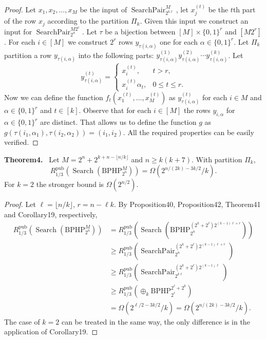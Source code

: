 \documentclass[10pt,a4paper]{article}
\newenvironment{authorclaim}[1]{\par\medskip\noindent\textbf{#1.}\ \ignorespaces}{\par\medskip}
\begin{document}
\begin{proof}
Let $x_1,x_2,\ldots,x_M$ be the input of $\operatorname{SearchPair}_{2^{k\ell}}^M$, let $x_j^{(t)}$ be the $t$th part of the row $x_j$ according to the partition $\Pi_k$. Given this input we construct an input for $\operatorname{SearchPair}_{2^n}^{M2^r}$.
Let $\tau$ be a bijection between $[M]\times\{0,1\}^r$ and $[M2^r]$.
For each $i\in[M]$ we construct $2^r$ rows $y_{\tau(i,\alpha)}$ one for each $\alpha\in\{0,1\}^r$. Let $\Pi_k$ partition a row $y_{\tau(i,\alpha)}$ into the following parts: $y_{\tau(i,\alpha)}^{(1)}y_{\tau(i,\alpha)}^{(2)}\cdots y_{\tau(i,\alpha)}^{(k)}$. Let
\[
y_{\tau(i,\alpha)}^{(t)}
=\begin{cases}x_i^{(t)},&t>r,\\x_i^{(t)}\alpha_t,&0\le t\le r.\end{cases}
\]
Now we can define the function $f_t(x_1^{(t)},\ldots,x_M^{(t)})$ as $y_{\tau(i,\alpha)}^{(t)}$ for each $i\in M$ and $\alpha\in\{0,1\}^r$ and $t\in[k]$. Observe that for each $i\in[M]$ the rows $y_{i,\alpha}$ for $\alpha\in\{0,1\}^r$ are distinct. That allows us to define the function $g$ as $g(\tau(i_1,\alpha_1),\tau(i_2,\alpha_2))=(i_1,i_2)$. All the required properties can be easily verified.
\end{proof}
\begin{authorclaim}{Theorem4}
Let $M=2^n+2^{k+n-\lfloor n/k\rfloor}$ and $n\ge k(k+7)$. With partition $\Pi_k$,
\[
R^{\mathrm{pub}}_{1/3}(\operatorname{Search}(\mathrm{BPHP}_{2^n}^M))
=\Omega(2^{n/(2k)-3k/2}/k).
\]
For $k=2$ the stronger bound is $\Omega(2^{n/2})$.
\end{authorclaim}
\begin{proof}
Let $\ell=\lfloor n/k\rfloor$, $r=n-\ell k$. By Proposition40, Proposition42, Theorem41 and Corollary19, respectively,
\begin{align*}
R^{\mathrm{pub}}_{1/3}(\operatorname{Search}(\mathrm{BPHP}_{2^n}^M))
&=R^{\mathrm{pub}}_{1/3}(\operatorname{Search}(\mathrm{BPHP}_{2^n}^{(2^k+2^\ell)2^{(k-1)\ell+r}}))\\
&\ge R^{\mathrm{pub}}_{1/3}(\operatorname{SearchPair}_{2^n}^{(2^k+2^\ell)2^{(k-1)\ell+r}})\\
&\ge R^{\mathrm{pub}}_{1/3}(\operatorname{SearchPair}_{2^{k\ell}}^{(2^k+2^\ell)2^{(k-1)\ell}})\\
&\ge R^{\mathrm{pub}}_{1/3}(\oplus_k\mathrm{BPHP}_{2^\ell}^{2^\ell+2^k})\\
&=\Omega(2^{\ell/2-3k/2}/k)=\Omega(2^{n/(2k)-3k/2}/k).
\end{align*}
The case of $k=2$ can be treated in the same way, the only difference is in the application of Corollary19.
\end{proof}
\end{document}
